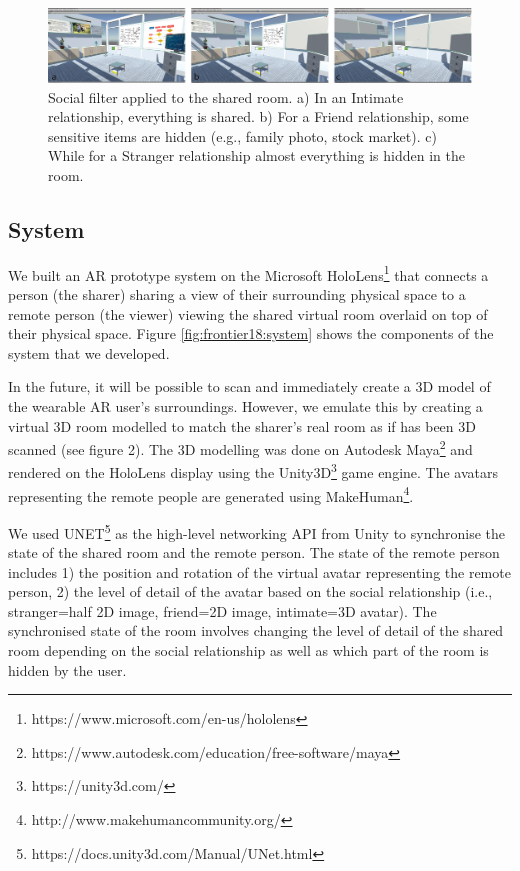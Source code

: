 \begin{figure}
\begin{center}
\includegraphics[width=\linewidth]{images/frontier18/images-02.png}
\caption{Social filter applied to the shared room. a) In an Intimate relationship, everything is shared. b) For a Friend relationship, some sensitive items are hidden (e.g., family photo, stock market). c) While for a Stranger relationship almost everything is hidden in the room.}\label{fig:frontier18:social-filter}
\end{center}
\end{figure}

\subsection{System}


We built an AR prototype system on the Microsoft HoloLens\footnote{https://www.microsoft.com/en-us/hololens} that connects a person (the sharer) sharing a view of their surrounding physical space to a remote person (the viewer) viewing the shared virtual room overlaid on top of their physical space. Figure \ref{fig:frontier18:system} shows the components of the system that we developed.

In the future, it will be possible to scan and immediately create a 3D model of the wearable AR user’s surroundings. However, we emulate this by creating a virtual 3D room modelled to match the sharer’s real room as if has been 3D scanned (see figure 2).  The 3D modelling was done on Autodesk Maya\footnote{https://www.autodesk.com/education/free-software/maya} and rendered on the HoloLens display using the Unity3D\footnote{https://unity3d.com/} game engine. The avatars representing the remote people are generated using MakeHuman\footnote{http://www.makehumancommunity.org/}.

We used UNET\footnote{https://docs.unity3d.com/Manual/UNet.html} as the high-level networking API from Unity to synchronise the state of the shared room and the remote person. The state of the remote person includes 1) the position and rotation of the virtual avatar representing the remote person, 2) the level of detail of the avatar based on the social relationship (i.e., stranger=half 2D image, friend=2D image, intimate=3D avatar). The synchronised state of the room involves changing the level of detail of the shared room depending on the social relationship as well as which part of the room is hidden by the user. 

